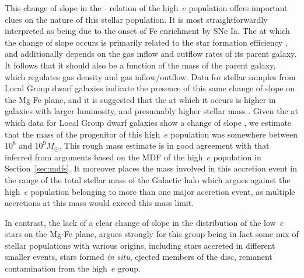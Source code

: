 This change of slope in the \mgfe{}-\feh{} relation of the
high~$e$ population offers important clues on the nature of this
stellar population.  It is most straightforwardly interpreted as
being due to the onset of Fe enrichment by SNe Ia.  The \feh{} at
which the change of slope occurs is primarily related to the star
formation efficiency \citep[e.g.][]{2017ApJ...837..183W}, and
additionally depends on the gas inflow and outflow rates of its
parent galaxy. It follows that it should also be a function of the
mass of the parent galaxy,
which regulates gas density and gas inflow/outflow.  Data for stellar
samples from Local Group dwarf galaxies indicate the presence of
this same change of slope on the Mg-Fe plane, and it is suggested
that the \feh{} at which it occurs is higher in galaxies with larger
luminosity, and presumably higher stellar mass
\citep[see,e.g.][]{2009ARA&A..47..371T}.  Given the \feh{} at which
data for Local Group dwarf galaxies show a change of slope
\citep[see,e.g.][]{2009ARA&A..47..371T}, we estimate that the mass
of the progenitor of this high~$e$ population was somewhere between
$10^{8}$ and $10^{9} M_\odot$. This rough mass estimate is in good
agreement with that inferred from arguments based on the MDF of the
high~$e$ population in Section~\ref{sec:mdfs}.  It moreover places
the mass involved in this accretion event in the range of the total
stellar mass of the Galactic halo \citep[$\sim 4 - 7 \times 10^8\
\mathrm{M_{\odot}}$] {2016ARA&A..54..529B} which argues against the
high~$e$ population belonging to more than one major accretion
event, as multiple accretions at this mass would exceed this mass
limit. 

In contrast, the lack of a clear change of slope in the
 distribution of the low~$e$ stars on the Mg-Fe plane, argues
strongly for this group being in fact some mix of stellar
populations with various origins, including stars accreted in
different smaller events, stars formed \emph{in situ}, ejected members
of the disc, remanent contamination from the high~$e$ group.

